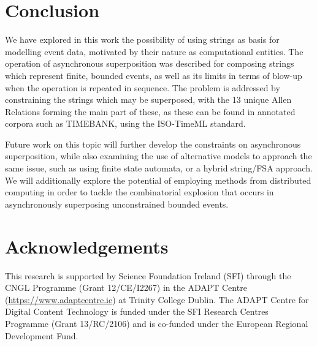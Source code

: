 \documentclass[a4paper,11pt,leqno]{article}
\begin{document}
\section{Conclusion}\label{conclusion}
We have explored in this work the possibility of using strings as basis for 
modelling event data, motivated by their nature as computational entities. The 
operation of asynchronous superposition was described for composing strings 
which represent finite, bounded events, as well as its limits in terms of 
blow-up when the operation is repeated in sequence. The problem is addressed by 
constraining the strings which may be superposed, with the 13 unique 
Allen Relations forming the main part of these, as these can be found in 
annotated corpora such as TIMEBANK, using the ISO-TimeML standard.

Future work on this topic will further develop the constraints on asynchronous 
superposition, while also examining the use of alternative models to 
approach the same issue, such as using finite state automata, or a hybrid 
string/FSA approach. We will additionally explore the potential of employing 
methods from distributed computing in order to tackle the combinatorial 
explosion that occurs in asynchronously superposing unconstrained bounded 
events.
\section*{Acknowledgements}
This research is supported by Science Foundation Ireland (SFI) through the CNGL 
Programme (Grant 12/CE/I2267) in the ADAPT Centre 
(\url{https://www.adaptcentre.ie}) at Trinity College Dublin. The
ADAPT Centre for Digital Content Technology is funded under the SFI Research 
Centres Programme (Grant 13/RC/2106) and is co-funded under the European 
Regional Development Fund.

{}

\end{document}
